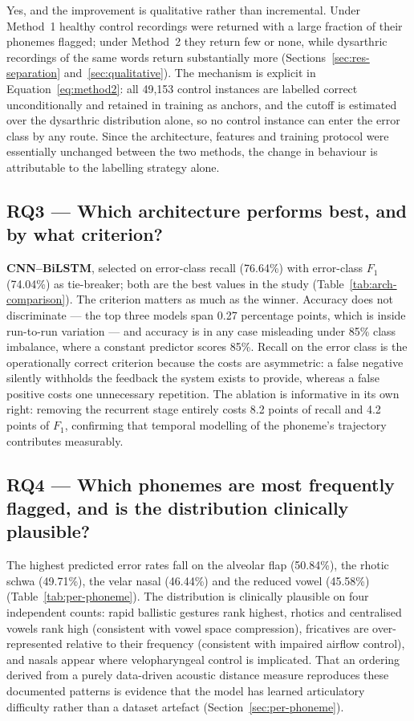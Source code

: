 Yes, and the improvement is qualitative rather than incremental. Under Method~1
healthy control recordings were returned with a large fraction of their phonemes
flagged; under Method~2 they return few or none, while dysarthric recordings of
the same words return substantially more
(Sections~\ref{sec:res-separation} and~\ref{sec:qualitative}). The mechanism is
explicit in Equation~\eqref{eq:method2}: all 49{,}153 control instances are
labelled correct unconditionally and retained in training as anchors, and the
cutoff is estimated over the dysarthric distribution alone, so no control
instance can enter the error class by any route. Since the architecture,
features and training protocol were essentially unchanged between the two
methods, the change in behaviour is attributable to the labelling strategy
alone.

\subsection*{RQ3 --- Which architecture performs best, and by what criterion?}

\textbf{CNN--BiLSTM}, selected on error-class recall (76.64\%) with error-class
$F_1$ (74.04\%) as tie-breaker; both are the best values in the study
(Table~\ref{tab:arch-comparison}). The criterion matters as much as the winner.
Accuracy does not discriminate --- the top three models span 0.27 percentage
points, which is inside run-to-run variation --- and accuracy is in any case
misleading under 85\% class imbalance, where a constant predictor scores 85\%.
Recall on the error class is the operationally correct criterion because the
costs are asymmetric: a false negative silently withholds the feedback the
system exists to provide, whereas a false positive costs one unnecessary
repetition. The ablation is informative in its own right: removing the recurrent
stage entirely costs 8.2 points of recall and 4.2 points of $F_1$, confirming
that temporal modelling of the phoneme's trajectory contributes measurably.

\subsection*{RQ4 --- Which phonemes are most frequently flagged, and is the
distribution clinically plausible?}

The highest predicted error rates fall on the alveolar flap  (50.84\%),
the rhotic schwa  (49.71\%), the velar nasal  (46.44\%) and the
reduced vowel  (45.58\%) (Table~\ref{tab:per-phoneme}). The distribution
is clinically plausible on four independent counts: rapid ballistic gestures
rank highest, rhotics and centralised vowels rank high (consistent with vowel
space compression), fricatives are over-represented relative to their frequency
(consistent with impaired airflow control), and nasals appear where
velopharyngeal control is implicated. That an ordering derived from a purely
data-driven acoustic distance measure reproduces these documented patterns is
evidence that the model has learned articulatory difficulty rather than a
dataset artefact (Section~\ref{sec:per-phoneme}).

